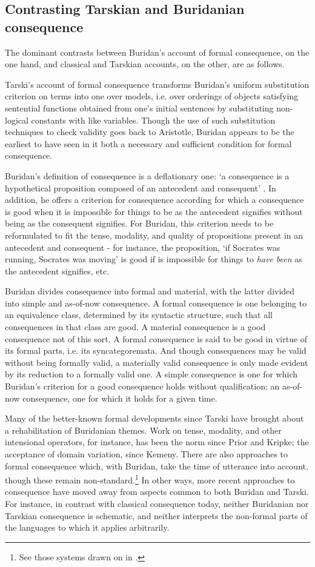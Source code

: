 \documentclass[]{article}
\begin{document}
		\subsection{Contrasting Tarskian and Buridanian consequence}
		The dominant contrasts between Buridan's account of formal consequence, on the one hand, and classical and Tarskian accounts, on the other, are as follows. 
		
		Tarski's account of formal consequence transforms Buridan's uniform substitution criterion on terms into one over models, i.e. over orderings of objects satisfying sentential functions obtained from one's initial sentences by substituting non-logical constants with like variables. Though the use of such substitution techniques to check validity goes back to Aristotle, Buridan appears to be the earliest to have seen in it both a necessary and sufficient condition for formal consequence.
		
		Buridan's definition of consequence is a deflationary one: `a consequence is a hypothetical proposition composed of an antecedent and consequent' \cite[I.3]{BuridanTC}. In addition, he offers a criterion for consequence according for which a consequence is good when it is impossible for things to be as the antecedent signifies without being as the consequent signifies. For Buridan, this criterion needs to be reformulated to fit the tense, modality, and quality of propositions present in an antecedent and consequent - for instance, the proposition, `if Socrates was running, Socrates was moving' is good if is impossible for things to \textit{have been} as the antecedent signifies, etc. 
		
		Buridan divides consequence into formal and material, with the latter divided into simple and as-of-now consequence. A formal consequence is one belonging to an equivalence class, determined by its syntactic structure, such that all consequences in that class are good. A material consequence is a good consequence not of this sort. A formal consequence is said to be good in virtue of its formal parts, i.e. its syncategoremata. And though consequences may be valid without being formally valid, a materially valid consequence is only made evident by its reduction to a formally valid one. A simple consequence is one for which Buridan's criterion for a good consequence holds without qualification; an as-of-now consequence, one for which it holds for a given time.
		
		Many of the better-known formal developments since Tarski have brought about a rehabilitation of Buridanian themes. Work on tense, modality, and other intensional operators, for instance, has been the norm since Prior and Kripke; the acceptance of domain variation, since Kemeny. There are also approaches to formal consequence which, with Buridan, take the time of utterance into account, though these remain non-standard.\footnote{See those systems drawn on in \cite{DutilhNovaes2005,DutilhNovaes2007b}.} In other ways, more recent approaches to consequence have moved away from aspects common to both Buridan and Tarski. For instance, in contrast with classical consequence today, neither Buridanian nor Tarskian consequence is schematic, and neither interprets the non-formal parts of the languages to which it applies arbitrarily.
		
\end{document}
